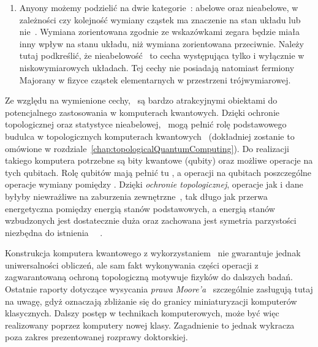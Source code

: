 \begin{enumerate}
\item {}
Anyony możemy podzielić na dwie kategorie~\cite{bhattacharjee.mj.2017}: abelowe oraz nieabelowe, w zależności czy kolejność wymiany cząstek ma znaczenie na stan układu lub nie~\cite{lahtinen.pachos.2017}.
Wymiana zorientowana zgodnie ze wskazówkami zegara będzie miała inny wpływ na stanu układu, niż wymiana zorientowana przeciwnie.
Należy tutaj podkreślić, że nieabelowość \MZM\ to cecha występująca tylko i wyłącznie w niskowymiarowych układach.
Tej cechy nie posiadają natomiast fermiony Majorany w fizyce cząstek elementarnych w przestrzeni trójwymiarowej.

\end{enumerate}

Ze względu na wymienione cechy, \MZM\ są bardzo atrakcyjnymi obiektami do potencjalnego zastosowania w komputerach kwantowych. 
Dzięki ochronie topologicznej oraz statystyce nieabelowej, \MZM\ mogą pełnić rolę podstawowego budulca w topologicznych komputerach kwantowych~\cite{kitaev.2003,sarma.freedman.2005,nayak.simon.2008,stanescu.2016,field.simula.2018} (dokładniej zostanie to omówione w rozdziale~\ref{chap:topologicalQuantumComputing}).
Do realizacji takiego komputera potrzebne są bity kwantowe (qubity) oraz możliwe operacje na tych qubitach.
Rolę qubitów mają pełnić tu \MZM, a operacji na qubitach poszczególne operacje wymiany pomiędzy \MZM.
Dzięki \textit{ochronie topologicznej}, operacje jak i dane byłyby niewrażliwe na zaburzenia zewnętrzne~\cite{nayak.simon.2008, hasan.kane.2010, beenakker.2013, elliott.franz.2015, beenakker.2019}, 
tak długo jak przerwa energetyczna pomiędzy energią stanów podstawowych, a energią stanów wzbudzonych jest dostatecznie duża oraz zachowana jest symetria parzystości niezbędna do istnienia \MZM\ ~\cite{cheng.lutchyn.2012}.

Konstrukcja komputera kwantowego z wykorzystaniem \MZM\ nie gwarantuje jednak uniwersalności obliczeń, ale sam fakt wykonywania części operacji z zagwarantowaną ochroną topologiczną motywuje fizyków do dalszych badań.
Ostatnie raporty dotyczące wysycania \textit{prawa Moore'a}~\cite{moore.1965} szczególnie zasługują tutaj na uwagę, gdyż oznaczają zbliżanie się do granicy miniaturyzacji komputerów klasycznych.
Dalszy postęp w technikach komputerowych, może być więc realizowany poprzez komputery nowej klasy.
Zagadnienie to jednak wykracza poza zakres prezentowanej rozprawy doktorskiej.

